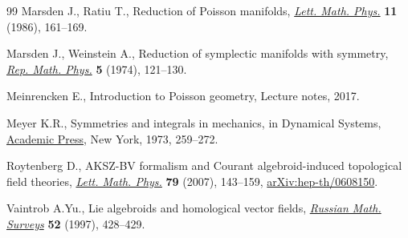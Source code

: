 \documentclass[10pt,a4paper]{amsart}
\numberwithin{equation}{section}
\begin{document}
\begin{thebibliography}{99}
Marsden J., Ratiu T., Reduction of {P}oisson manifolds, \href{https://doi.org/10.1007/BF00398428}{\textit{Lett. Math.
 Phys.}} \textbf{11} (1986), 161--169.

Marsden J., Weinstein A., Reduction of symplectic manifolds with symmetry,
 \href{https://doi.org/10.1016/0034-4877(74)90021-4}{\textit{Rep. Math. Phys.}} \textbf{5} (1974), 121--130.

Meinrencken E., Introduction to {P}oisson geometry, {L}ecture notes, 2017.

Meyer K.R., Symmetries and integrals in mechanics, in Dynamical {S}ystems,
 \href{https://doi.org/10.1016/B978-0-12-550350-1.50025-4}{Academic Press}, New York, 1973, 259--272.

Roytenberg D., A{KSZ}-{BV} formalism and {C}ourant algebroid-induced
 topological field theories, \href{https://doi.org/10.1007/s11005-006-0134-y}{\textit{Lett. Math. Phys.}} \textbf{79} (2007),
 143--159, \href{https://arxiv.org/abs/hep-th/0608150}{arXiv:hep-th/0608150}.

Vaintrob A.Yu., Lie algebroids and homological vector fields, \href{https://doi.org/10.1070/RM1997v052n02ABEH001802}{\textit{Russian
 Math. Surveys}} \textbf{52} (1997), 428--429.

\end{thebibliography}
\end{document}

